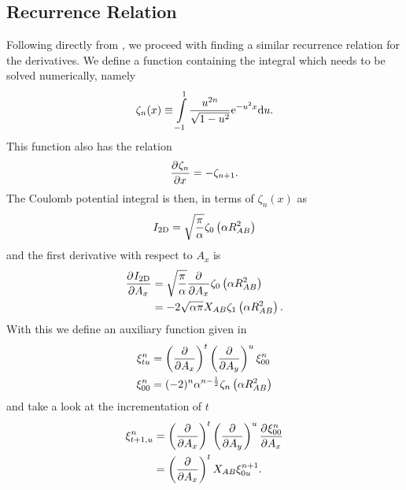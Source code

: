 \subsection{Recurrence Relation\label{sub:445}}
    Following directly from \cite{HelgakerTaylorGauss}, we proceed with finding
    a similar recurrence relation for the derivatives. We define a function
    containing the integral which needs to be solved numerically, namely 
        \begin{equation}
            \zeta_n(x) \equiv \int\limits^1_{-1} \frac{u^{2n}}{\sqrt{1 -
            u^2}} \mathrm{e}^{-u^2x} \mathrm{d} u.
            \label{eq:zetaDef}
        \end{equation}
    This function also has the relation
        \begin{equation}
            \prd{x}[\zeta_n] = -\zeta_{n+1}.
        \end{equation}
    The Coulomb potential integral is then, in terms of $\zeta_n(x)$ as
        \begin{equation}
            I_{\text{2D}} = \sqrt{\frac{\pi}{\alpha}} \zeta_0\left(\alpha
            R^2_{AB}\right)
        \end{equation}
    and the first derivative with respect to $A_x$ is
        \begin{align}
            \prd{A_x}[\twoDI] &= \sqrt{\frac{\pi}{\alpha}} \prd{A_x}
            \zeta_0\left(\alpha R^2_{AB}\right) \nonumber \\
            &= -2\sqrt{\alpha\pi}X_{AB}\zeta_1\left(\alpha R^2_{AB}\right).
        \end{align}
    With this we define an auxiliary function given in 
        \begin{equation}
            \begin{aligned}
                \xi^n_{tu} &=\left(\frac{\mathrm{\partial}}{\mathrm{\partial} A_x}\right)^{t}\left(\frac{\mathrm{\partial}}{\mathrm{\partial} A_y}\right)^{u} \xi^n_{00} \\
                \xi^n_{00} &= (-2)^n\alpha^{n-\frac{1}{2}} \zeta_n\left(\alpha
                R^2_{AB}\right)
            \end{aligned}
            \label{eq:auxiliary2d1}
        \end{equation}
    and take a look at the incrementation of $t$
        \begin{align}
            \xi^n_{t+1,u} &= \prdp{A_x}{t}\prdp{A_y}{u} \prd{A_x}[\xi^n_{00}]
            \nonumber \\
            &= \prdp{A_x}{t}X_{AB}\xi^{n+1}_{0u}.
            \label{eq:Rtincr}
        \end{align}
